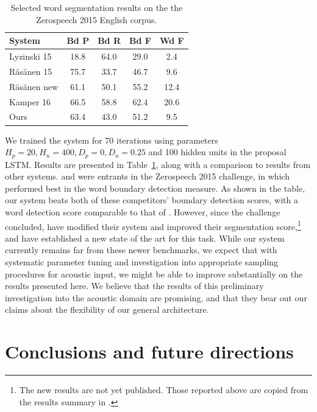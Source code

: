 \documentclass[11pt,letterpaper]{article}
\begin{document}
\begin{table}
\begin{tabular}{p{2.1cm}cccc}
System & Bd P & Bd R & Bd F & Wd F\\
\hline
Lyzinski 15           & 18.8 & 64.0 & 29.0 & 2.4\\
R\"{a}s\"{a}nen 15       & 75.7 & 33.7 & 46.7 & 9.6\\
R\"{a}s\"{a}nen new       & 61.1 & 50.1 & 55.2 & 12.4\\
Kamper 16       & 66.5 & 58.8 & 62.4 & 20.6\\
\hline
Ours & 63.4 & 43.0 & 51.2 & 9.5\\
\end{tabular}
\caption{Selected word segmentation results on the the Zerospeech 2015 English corpus.}
\label{tab-acoust-results}
\end{table}

We trained the system for 70 iterations using parameters $H_p=20,
H_u=400, D_p=0, D_u=0.25$ and 100 hidden units in the proposal
LSTM. Results are presented in Table~\ref{tab-acoust-results}, along
with a comparison to results from other systems.  
and  were entrants in the Zerospeech 2015
challenge, in which  performed best in the word
boundary detection measure.  As shown in the table, our system beats
both of these competitors' boundary detection scores, with a word
detection score comparable to that of .  However,
since the challenge concluded,  have modified their
system and improved their segmentation score,\footnote{The new results
  are not yet published. Those reported above are copied from the
  results summary in .} and  have
established a new state of the art for this task.  While our system
currently remains far from these newer benchmarks, we expect that with
systematic parameter tuning and investigation into appropriate
sampling procedures for acoustic input, we might be able to improve
substantially on the results presented here.  We believe that the
results of this preliminary investigation into the acoustic domain are
promising, and that they bear out our claims about the flexibility of
our general architecture.


\section{Conclusions and future directions}
\end{document}
